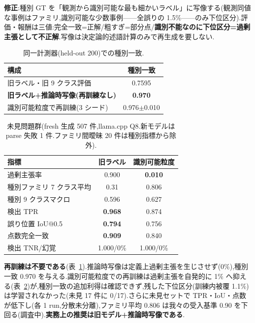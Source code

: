 \documentclass[a4paper,twocolumn,10pt]{jarticle}
\begin{document}
\textbf{修正}:種別 GT を「観測から識別可能な最も細かいラベル」に写像する(観測同値な事例はファミリ,識別可能な少数事例——全誤りの 1.5\%——のみ下位区分).評価・報酬は三値:完全一致=正解/粗すぎ=部分点/\textbf{識別不能なのに下位区分=過剰主張として不正解}.写像は決定論的述語計算のみで再生成を要しない.

\begin{table}[t]\centering\small
\caption{同一計測器(held-out 200)での種別一致.}\label{tab:heldout}
\begin{tabular}{lc}\toprule
構成 & 種別一致\\\midrule
旧ラベル・旧 9 クラス評価 & 0.7595\\
\textbf{旧ラベル+推論時写像(再訓練なし)} & \textbf{0.970}\\
識別可能粒度で再訓練(3 シード) & 0.976$\pm$0.010\\\bottomrule
\end{tabular}
\end{table}

\begin{table}[t]\centering\small
\caption{未見問題群(fresh 生成 507 件,llama.cpp Q8.新モデルは parse 失敗 1 件.ファミリ間曖昧 20 件は種別指標から除外).}\label{tab:eval400}
\begin{tabular}{lcc}\toprule
指標 & 旧ラベル & 識別可能粒度\\\midrule
過剰主張率 & 0.900 & \textbf{0.010}\\
種別ファミリ 7 クラス平均 & 0.31 & 0.806\\
種別 9 クラスマクロ & 0.596 & 0.627\\
検出 TPR & \textbf{0.968} & 0.874\\
誤り位置 IoU@0.5 & \textbf{0.794} & 0.756\\
点数完全一致 & \textbf{0.909} & 0.840\\
検出 TNR/幻覚 & 1.000/0\% & 1.000/0\%\\\bottomrule
\end{tabular}
\end{table}

\textbf{再訓練は不要である}(表~\ref{tab:heldout}).推論時写像は定義上過剰主張を生じさせず(0\%),種別一致 0.970 を与える.識別可能粒度での再訓練は過剰主張を自発的に 1\% へ抑える(表~\ref{tab:eval400})が,種別一致の追加利得は確認できず,残した下位区分(訓練内被覆 1.1\%)は学習されなかった(未見 17 件に 0/17).さらに未見セットで TPR・IoU・点数が低下し(各 1 run,分散未分離),ファミリ平均 0.806 は我々の受入基準 0.90 を下回る(調査中).\textbf{実務上の推奨は旧モデル+推論時写像である}.
\end{document}
